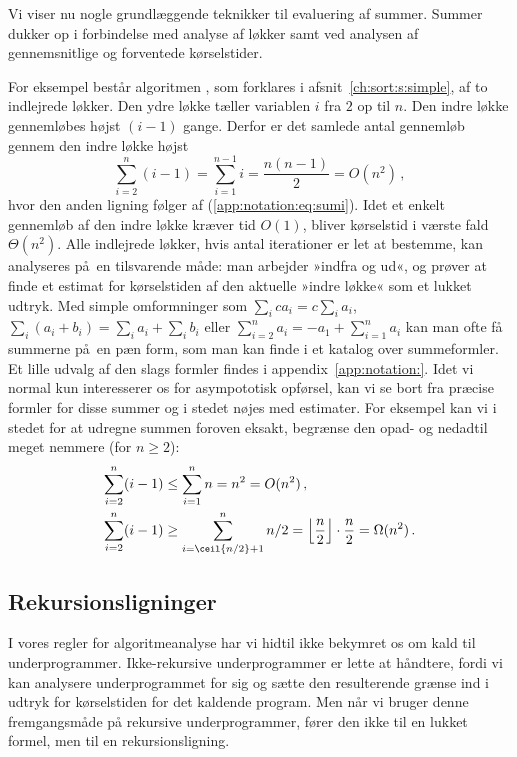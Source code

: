 %
Vi viser nu nogle grundlæggende teknikker til evaluering af summer.
Summer dukker op i forbindelse med analyse af løkker samt ved analysen af gennemsnitlige og forventede kørselstider.

For eksempel består algoritmen ,
som forklares i afsnit~\ref{ch:sort:s:simple}, af to indlejrede løkker.
Den ydre løkke tæller variablen $i$ fra $2$ op til  $n$.
Den indre løkke gennemløbes højst $(i-1)$ gange. 
Derfor er det samlede antal gennemløb gennem den indre løkke højst
\[
\sum_{i=2}^n (i-1)
 =\sum_{i=1}^{n-1} i 
 =\frac{n(n-1)}{2} = O(n^2)\,,\]
hvor den anden ligning følger af (\ref{app:notation:eq:sumi}).
Idet et enkelt gennemløb af den indre løkke kræver tid $O(1)$, bliver kørselstid i værste fald $\Theta(n^2)$.
Alle indlejrede løkker, hvis antal iterationer er let at bestemme, kan analyseres på en tilsvarende måde:
man arbejder »indfra og ud«, og prøver at finde et estimat for kørselstiden af den aktuelle »indre løkke« som et lukket udtryk.
Med simple omformninger som
$\sum_i ca_i=c\sum_ia_i$,
$\sum_i(a_i + b_i)=\sum_i a_i + \sum_i b_i$ eller
$\sum_{i=2}^n a_i=-a_1+\sum_{i=1}^n a_i$
kan man ofte få summerne på en pæn form, som man kan finde i et katalog over summeformler.
Et lille udvalg af den slags formler findes i appendix~\ref{app:notation:}.
Idet vi normal kun interesserer os for asympototisk opførsel, kan vi se bort fra præcise formler for disse summer og i stedet nøjes med estimater.
For eksempel kan vi i stedet for at udregne summen foroven eksakt, begrænse den opad- og nedadtil meget nemmere (for $n\ge 2$):
\begin{align*}
\sum_{i=2}^n (i-1) &\leq \sum_{i=1}^n n = n^2 = O(n^2)\,,\\
\sum_{i=2}^n (i-1) &\geq \sum_{i=\ceil{n/2}+1}^n n/2 = \left\lfloor\frac{n}{2}\right\rfloor \cdot\frac{n}{2}=
\Omega(n^2) \,. \end{align*}

\subsection{Rekursionsligninger}

%
I vores regler for algoritmeanalyse har vi hidtil ikke bekymret os om kald til underprogrammer.
Ikke-rekursive underprogrammer er lette at håndtere, fordi vi kan analysere underprogrammet for sig og sætte den resulterende grænse ind i udtryk for kørselstiden for det kaldende program.
Men når vi bruger denne fremgangsmåde på rekursive underprogrammer, fører den ikke til en lukket formel, men til en rekursionsligning.

